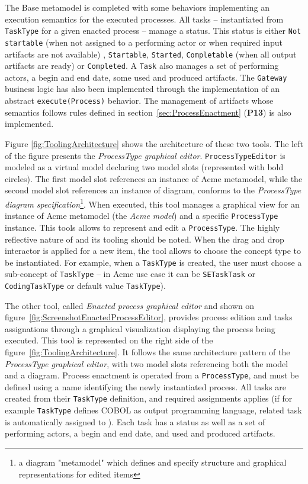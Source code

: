 The Base metamodel is completed with some behaviors implementing an execution semantics for the executed processes. All tasks -- instantiated from \texttt{TaskType} for a given enacted process -- manage a status. This status is either \texttt{Not startable} (when not assigned to a performing actor or when required input artifacts are not available) , \texttt{Startable}, \texttt{Started}, \texttt{Completable} (when all output artifacts are ready) or \texttt{Completed}. A \texttt{Task} also manages a set of performing actors, a begin and end date, some used and produced artifacts. The \texttt{Gateway} business logic has also been implemented through the implementation of an abstract \texttt{execute(Process)} behavior. The management of artifacts whose semantics follows rules defined in section~\ref{sec:ProcessEnactment} (\textbf{P13}) is also implemented.

Figure \ref{fig:ToolingArchitecture} shows the architecture of these two tools.
 The left of the figure presents the \textit{ProcessType graphical editor}. \texttt{ProcessTypeEditor} is modeled as a virtual model declaring two model slots (represented with bold circles). The first model slot references an instance of Acme metamodel, while the second model slot references an instance of diagram, conforms to the \textit{ProcessType diagram specification}\footnote{a diagram "metamodel" which defines and specify structure and graphical representations for edited items}. When executed, this tool manages a graphical view for an instance of Acme metamodel (the \textit{Acme model}) and a specific \texttt{ProcessType} instance. This tools allows to represent and edit a \texttt{ProcessType}. The highly reflective nature of \FML and its tooling should be noted. When the drag and drop interactor is applied for a new item, the tool allows to choose the concept type to be instantiated. For example, when a \texttt{TaskType} is created, the user must choose a sub-concept of \texttt{TaskType} -- in Acme use case it can be \texttt{SETaskTask} or \texttt{CodingTaskType} or default value \texttt{TaskType}). 

The other tool, called \textit{Enacted process graphical editor} and shown on figure~\ref{fig:ScreenshotEnactedProcessEditor}, provides process edition and tasks assignations through a graphical visualization displaying the process being executed. This tool is represented on the right side of the figure~\ref{fig:ToolingArchitecture}. It follows the same architecture pattern of the \textit{ProcessType graphical editor}, with two model slots referencing both the model and a diagram. Process enactment is operated from a \texttt{ProcessType}, and must be defined using a name identifying the newly instantiated process. All tasks are created from their \texttt{TaskType} definition, and required assignments applies (if for example  \texttt{TaskType} defines COBOL as output programming language, related task is automatically assigned to ). Each task has a status as well as a set of performing actors, a begin and end date, and used and produced artifacts. 





